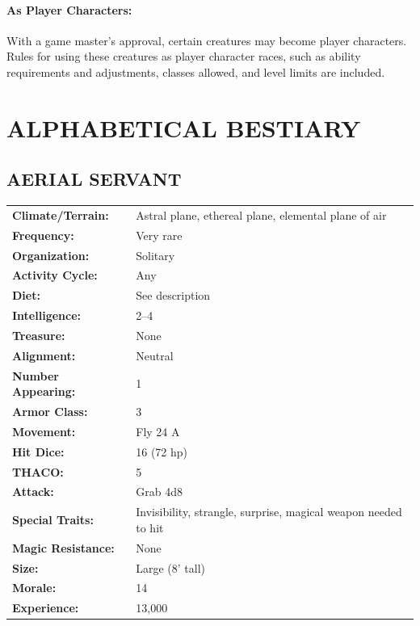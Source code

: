 \begin{multicols}{2}
\paragraph{As Player Characters:} With a game master's approval, certain creatures may become player characters. Rules for using these creatures as player character races, such as ability requirements and adjustments, classes allowed, and level limits are included.

\section{ALPHABETICAL BESTIARY}

\noindent
\begin{minipage}{\columnwidth}

\vspace{1em}

\subsection{AERIAL SERVANT}

\noindent
\begin{tabular}{p{}p{}}
\textbf{Climate/Terrain:}	& Astral plane, ethereal plane, elemental plane of air \\
\textbf{Frequency:} 		& Very rare \\
\textbf{Organization:} 		& Solitary \\
\textbf{Activity Cycle:} 	& Any \\
\textbf{Diet:} 				& See description \\
\textbf{Intelligence:} 		& 2--4 \\
\textbf{Treasure:} 			& None \\
\textbf{Alignment:} 		& Neutral \\
\hline
\textbf{Number Appearing:} 	& 1 \\
\textbf{Armor Class:} 		& 3 \\
\textbf{Movement:} 			& Fly 24 A \\
\textbf{Hit Dice:} 			& 16 (72 hp) \\
\textbf{THACO:} 			& 5 \\
\textbf{Attack:} 			& Grab 4d8 \\
\textbf{Special Traits:} 	& Invisibility, strangle, surprise, magical weapon needed to hit \\
\textbf{Magic Resistance:} 	& None \\
\textbf{Size:} 				& Large (8' tall) \\
\textbf{Morale:} 			& 14 \\
\textbf{Experience:} 		& 13,000 \\ %
\end{tabular}


\end{minipage}
\end{multicols}
